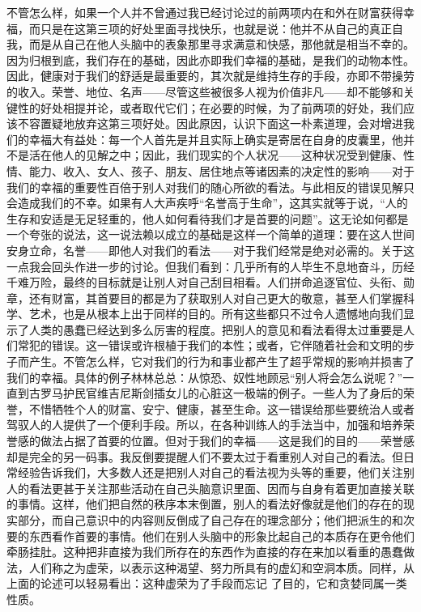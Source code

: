 \documentclass[12pt,oneside]{book}
\begin{document}
不管怎么样，如果一个人并不曾通过我已经讨论过的前两项内在和外在财富获得幸福，而只是在这第三项的好处里面寻找快乐，也就是说：他并不从自己的真正自我，而是从自己在他人头脑中的表象那里寻求满意和快感，那他就是相当不幸的。因为归根到底，我们存在的基础，因此亦即我们幸福的基础，是我们的动物本性。因此，健康对于我们的舒适是最重要的，其次就是维持生存的手段，亦即不带操劳的收入。荣誉、地位、名声——尽管这些被很多人视为价值非凡——却不能够和关键性的好处相提并论，或者取代它们；在必要的时候，为了前两项的好处，我们应该不容置疑地放弃这第三项好处。因此原因，认识下面这一朴素道理，会对增进我们的幸福大有益处：每一个人首先是并且实际上确实是寄居在自身的皮囊里，他并不是活在他人的见解之中；因此，我们现实的个人状况——这种状况受到健康、性情、能力、收入、女人、孩子、朋友、居住地点等诸因素的决定性的影响——对于我们的幸福的重要性百倍于别人对我们的随心所欲的看法。与此相反的错误见解只会造成我们的不幸。如果有人大声疾呼“名誉高于生命”，这其实就等于说，“人的生存和安适是无足轻重的，他人如何看待我们才是首要的问题”。这无论如何都是一个夸张的说法，这一说法赖以成立的基础是这样一个简单的道理：要在这人世间安身立命，名誉——即他人对我们的看法——对于我们经常是绝对必需的。关于这一点我会回头作进一步的讨论。但我们看到：几乎所有的人毕生不息地奋斗，历经千难万险，最终的目标就是让别人对自己刮目相看。人们拼命追逐官位、头衔、勋章，还有财富，其首要目的都是为了获取别人对自己更大的敬意，甚至人们掌握科学、艺术，也是从根本上出于同样的目的。所有这些都只不过令人遗憾地向我们显示了人类的愚蠢已经达到多么厉害的程度。把别人的意见和看法看得太过重要是人们常犯的错误。这一错误或许根植于我们的本性；或者，它伴随着社会和文明的步子而产生。不管怎么样，它对我们的行为和事业都产生了超乎常规的影响并损害了我们的幸福。具体的例子林林总总：从惊恐、奴性地顾忌“别人将会怎么说呢？”一直到古罗马护民官维吉尼斯剑插女儿的心脏这一极端的例子。一些人为了身后的荣誉，不惜牺牲个人的财富、安宁、健康，甚至生命。这一错误给那些要统治人或者驾驭人的人提供了一个便利手段。所以，在各种训练人的手法当中，加强和培养荣誉感的做法占据了首要的位置。但对于我们的幸福——这是我们的目的——荣誉感却是完全的另一码事。我反倒要提醒人们不要太过于看重别人对自己的看法。但日常经验告诉我们，大多数人还是把别人对自己的看法视为头等的重要，他们关注别人的看法更甚于关注那些活动在自己头脑意识里面、因而与自身有着更加直接关联的事情。这样，他们把自然的秩序本末倒置，别人的看法好像就是他们的存在的现实部分，而自己意识中的内容则反倒成了自己存在的理念部分；他们把派生的和次要的东西看作首要的事情。他们在别人头脑中的形象比起自己的本质存在更令他们牵肠挂肚。这种把非直接为我们所存在的东西作为直接的存在来加以看重的愚蠢做法，人们称之为虚荣，以表示这种渴望、努力所具有的虚幻和空洞本质。同样，从上面的论述可以轻易看出：这种虚荣为了手段而忘记
了目的，它和贪婪同属一类性质。 
\end{document}
